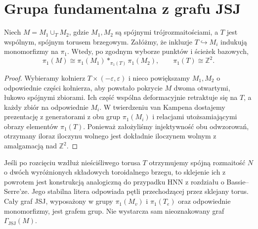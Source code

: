 \begin{center}
\end{center}

\section{Grupa fundamentalna z grafu JSJ}
\label{sec:tg-jsj-groups}

\begin{stwierdzenie}
Niech $M=M_1\cup_T M_2$, gdzie $M_1,M_2$ są
spójnymi trójrozmaitościami, a $T$ jest wspólnym,
spójnym torusem brzegowym. Załóżmy, że inkluzje
$T\hookrightarrow M_i$ indukują monomorfizmy na
$\pi_1$. Wtedy, po zgodnym wyborze punktów i ścieżek
bazowych,
\[
\pi_1(M)\cong\pi_1(M_1)
 *_{\pi_1(T)}\pi_1(M_2),
\qquad \pi_1(T)\cong\mathbb Z^2.
\]
\end{stwierdzenie}
\begin{proof}
Wybieramy kołnierz $T\times(-\varepsilon,\varepsilon)$
i nieco powiększamy $M_1,M_2$ o odpowiednie części
kołnierza, aby powstało pokrycie $M$ dwoma
otwartymi, łukowo spójnymi zbiorami. Ich część
wspólna deformacyjnie retraktuje się na $T$, a
każdy zbiór na odpowiednie $M_i$. W twierdzeniu
van Kampena dostajemy prezentację z generatorami
z obu grup $\pi_1(M_i)$ i relacjami utożsamiającymi
obrazy elementów $\pi_1(T)$. Ponieważ założyliśmy
injektywność obu odwzorowań, otrzymany iloraz
iloczynu wolnego jest dokładnie iloczynem wolnym
z amalgamacją nad $\mathbb Z^2$.
\end{proof}

\begin{uwaga}
Jeśli po rozcięciu wzdłuż nieściśliwego torusa
$T$ otrzymujemy spójną rozmaitość $N$ o dwóch
wyróżnionych składowych toroidalnego brzegu,
to sklejenie ich z powrotem jest konstrukcją
analogiczną do przypadku HNN z rozdziału o
Bassie--Serre'ze. Jego stabilna litera odpowiada
pętli przechodzącej przez sklejany torus.
Cały graf JSJ, wyposażony w grupy
$\pi_1(M_v)$ i $\pi_1(T_e)$ oraz odpowiednie
monomorfizmy, jest grafem grup. Nie wystarcza
sam nieoznakowany graf $\Gamma_{\mathrm{JSJ}}(M)$.
\end{uwaga}

